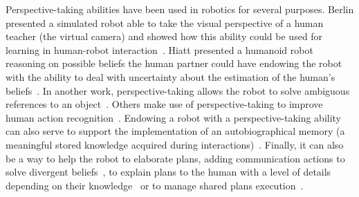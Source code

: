\documentclass[a4paper,11pt,twoside]{StyleThese}
\begin{document}
Perspective-taking abilities have been used in robotics for several purposes. Berlin \etal{} presented a simulated robot able to take the visual perspective of a human teacher (the virtual camera) and showed how this ability could be used for learning in human-robot interaction~\cite{berlin_2006_perspective}. Hiatt \etal{} presented a humanoid robot reasoning on possible beliefs the human partner could have endowing the robot with the ability to deal with uncertainty about the estimation of the human's beliefs~\cite{hiatt_2011_accommodating}. In another work, perspective-taking allows the robot to solve ambiguous references to an object~\cite{ros_2010_solving}. Others make use of perspective-taking to improve human action recognition~\cite{johnson_2005_perceptual}. Endowing a robot with a perspective-taking ability can also serve to support the implementation of an autobiographical memory (a meaningful stored knowledge acquired during interactions)~\cite{pointeau_2017_role}. Finally, it can also be a way to help the robot to elaborate plans, adding communication actions to solve divergent beliefs~\cite{warnier_2012_robot}, to explain plans to the human with a level of details depending on their knowledge~\cite{milliez_2016_using} or to manage shared plans execution~\cite{devin_2016_implemented}.
\end{document}
